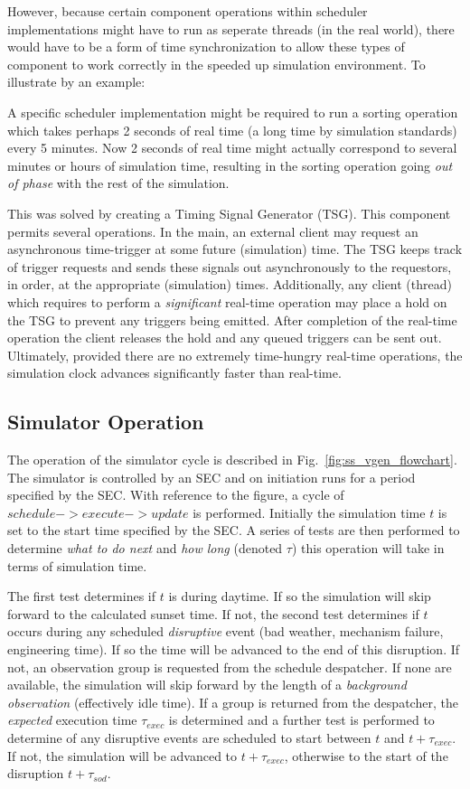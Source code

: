  However, because certain component operations within scheduler implementations might have to run as seperate threads (in the real world), there would have to be a form of time synchronization to allow these types of component to work correctly in the speeded up simulation environment. To illustrate by an example:

 A specific scheduler implementation might be required to run a sorting operation which takes perhaps 2 seconds of real time (a long time by simulation standards) every 5 minutes. Now 2 seconds of real time might actually correspond to several minutes or hours of simulation time, resulting in the sorting operation going \emph{out of phase} with the rest of the simulation. 

 This was solved by creating a Timing Signal Generator (TSG). This component permits several operations. In the main, an external client may request an asynchronous time-trigger at some future (simulation) time. The TSG keeps track of trigger requests and sends these signals out asynchronously to the requestors, in order, at the appropriate (simulation) times. Additionally, any client (thread) which requires to perform a \emph{significant} real-time operation may place a hold on the TSG to prevent any triggers being emitted. After completion of the real-time operation the client releases the hold and any queued triggers can be sent out. Ultimately, provided there are no extremely time-hungry real-time operations, the simulation clock advances significantly faster than real-time.

\subsection{Simulator Operation}
\label{ss:sim_ops}
The operation of the simulator cycle is described in Fig.~\ref{fig:ss_vgen_flowchart}. The simulator is controlled by an SEC and on initiation runs for a period specified by the SEC. With reference to the figure, a cycle of $schedule->execute->update$ is performed. Initially the simulation time $t$ is set to the start time specified by the SEC. A series of tests are then performed to determine \emph{what to do next} and \emph{how long} (denoted $\tau$) this operation will take in terms of simulation time. 

The first test determines if $t$ is during daytime. If so the simulation will skip forward to the calculated sunset time. If not, the second test determines if $t$ occurs during any scheduled \emph{disruptive} event (bad weather, mechanism failure, engineering time). If so the time will be advanced to the end of this disruption. If not, an observation group is requested from the schedule despatcher. If none are available, the simulation will skip forward by the length of a \emph{background observation} (effectively idle time). If a group is returned from the despatcher, the \emph{expected} execution time $\tau_{exec}$ is determined and a further test is performed to determine of any disruptive events are scheduled to start between $t$ and $t+\tau_{exec}$. If not, the simulation will be advanced to $t+\tau_{exec}$, otherwise to the start of the disruption $t+\tau_{sod}$. 

